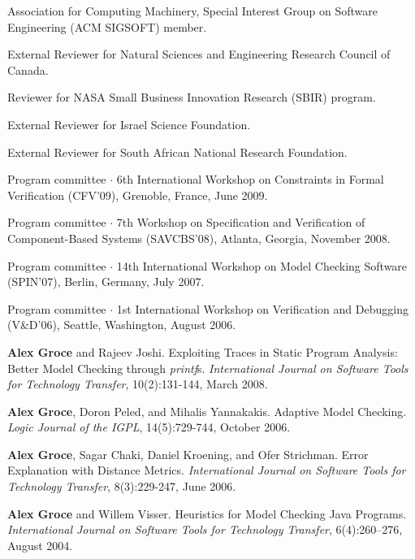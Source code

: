 \documentclass[ComputerScience]{vita}
\begin{document}
\begin{vita}
\begin{Professional Activities}
  \item Association for Computing Machinery, Special Interest Group on Software Engineering (ACM SIGSOFT) member.
\item External Reviewer for Natural Sciences and Engineering Research Council of Canada.
\item Reviewer for NASA Small Business Innovation Research (SBIR) program.
\item External Reviewer for Israel Science Foundation.
\item External Reviewer for South African National Research Foundation.
\end{Professional Activities}

\begin{Panel and Committee Service}
\item Program committee $\cdot$ 6th International Workshop on Constraints in Formal Verification (CFV'09), Grenoble, France, June 2009.
\item Program committee $\cdot$ 7th Workshop on Specification and Verification of Component-Based Systems (SAVCBS'08), Atlanta, Georgia, November 2008.
\item Program committee $\cdot$ 14th International Workshop on Model Checking Software (SPIN'07), Berlin, Germany, July 2007.
\item Program committee $\cdot$ 1st International Workshop on Verification and Debugging (V\&D'06), Seattle, Washington, August 2006.
\end{Panel and Committee Service}

\begin{Journal Publications}
\item
{\bf Alex Groce} and Rajeev Joshi.
\newblock Exploiting Traces in Static Program Analysis: Better Model Checking through \emph{printf}s.
\newblock \emph{International Journal on Software Tools for Technology Transfer}, 10(2):131-144, March 2008.
\item
{\bf Alex Groce}, Doron Peled, and Mihalis Yannakakis.
\newblock Adaptive Model Checking.
\newblock \emph{Logic Journal of the IGPL}, 14(5):729-744, October 2006.

\item
{\bf Alex Groce}, Sagar Chaki, Daniel Kroening, and Ofer Strichman.
\newblock Error Explanation with Distance Metrics.
\newblock \emph{International Journal on Software Tools for Technology Transfer}, 8(3):229-247, June 2006.

\item
{\bf Alex Groce} and Willem Visser.
\newblock Heuristics for Model Checking Java Programs.
\newblock \emph{International Journal on Software Tools for Technology Transfer}, 6(4):260--276, August 2004.



\end{Journal Publications}
\end{vita}
\end{document}
